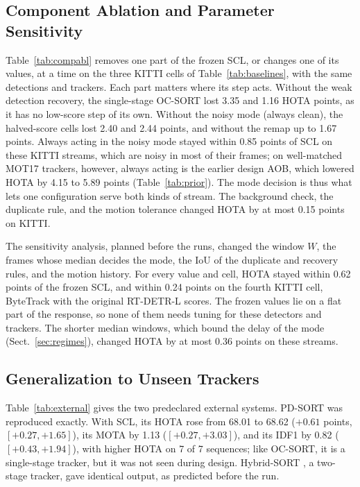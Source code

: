 \documentclass[pdflatex,sn-mathphys-num,iicol]{sn-jnl}
\newcommand{\scl}{SCL}
\newcommand{\aob}{AOB}
\begin{document}
\subsection{Component Ablation and Parameter Sensitivity}\label{sec:ablation}
Table~\ref{tab:compabl} removes one part of the frozen \scl{}, or changes one of its values, at a
time on the three KITTI cells of Table~\ref{tab:baselines}, with the same detections and trackers.
Each part matters where its step acts. Without the weak detection recovery, the single-stage
OC-SORT lost 3.35 and 1.16 HOTA points, as it has no low-score step of its own. Without the noisy
mode (always clean), the halved-score cells lost 2.40 and 2.44 points, and without the remap up to
1.67 points. Always acting in the noisy mode stayed within 0.85 points of \scl{} on these KITTI
streams, which are noisy in most of their frames; on well-matched MOT17 trackers, however, always
acting is the earlier design \aob{}, which lowered HOTA by 4.15 to 5.89 points
(Table~\ref{tab:prior}). The mode decision is thus what lets one configuration serve both kinds of
stream. The background check, the duplicate rule, and the motion tolerance changed HOTA by at most
0.15 points on KITTI.

The sensitivity analysis, planned before the runs, changed the window $W$, the frames whose median
decides the mode, the IoU of the duplicate and recovery rules, and the motion history. For every
value and cell, HOTA stayed within 0.62 points of the frozen \scl{}, and within 0.24 points on the
fourth KITTI cell, ByteTrack with the original RT-DETR-L scores. The frozen values lie on a flat
part of the response, so none of them needs tuning for these detectors and trackers. The shorter
median windows, which bound the delay of the mode (Sect.~\ref{sec:regimes}), changed HOTA by at most
0.36 points on these streams.


\subsection{Generalization to Unseen Trackers}\label{sec:external}
Table~\ref{tab:external} gives the two predeclared external systems. PD-SORT \cite{wang2025pdsort}
was reproduced exactly. With \scl{}, its HOTA rose from 68.01 to 68.62 ($+0.61$ points, $[+0.27,+1.65]$), its MOTA by
1.13 ($[+0.27,+3.03]$), and its IDF1 by 0.82 ($[+0.43,+1.94]$), with higher HOTA on 7 of 7
sequences; like OC-SORT, it is a single-stage tracker, but it was not seen during design.
Hybrid-SORT \cite{yang2024hybridsort}, a two-stage tracker, gave identical output, as predicted
before the run.
\end{document}
